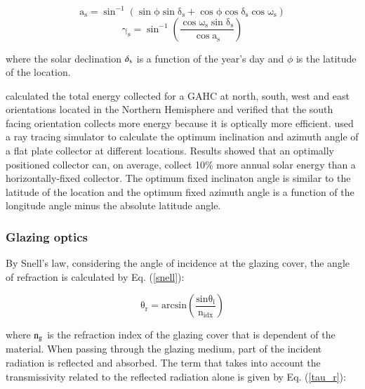 \begin{equation}
	\mathrm{{a_s} = {\sin ^{ - 1}}\left( {\sin \phi \sin {\delta _s} + \cos \phi \cos {\delta _s}\cos {\omega_s}} \right)}
	\label{solar_alt0}
\end{equation}
\vspace*{-0.5cm}
\begin{equation}
	\mathrm{\gamma_s = {\sin^{-1}}\left(\frac{\cos \omega_s \sin \delta_s}{\cos a_s}\right)}
	\label{azimuth0}
\end{equation}

\noindent where the solar declination $\delta_{\rm{s}}$ is a function of the year's day and $\phi$ is the latitude of the location.

\citet{Pottler1999} calculated the total energy collected for a GAHC at north, south, west and east orientations located in the Northern Hemisphere and verified that the south facing orientation collects more energy because it is optically more efficient. \citet{Roux2016} used a ray tracing simulator to calculate the optimum inclination and azimuth angle of a flat plate collector at different locations. Results showed that an optimally positioned collector can, on average, collect 10\% more annual solar energy than a horizontally-fixed collector. The optimum fixed inclinaton angle is similar to the latitude of the location and the optimum fixed azimuth angle is a function of the longitude angle minus the absolute latitude angle.

\subsubsection{Glazing optics}

By Snell's law, considering the angle of incidence at the glazing cover, the angle of refraction is calculated by Eq. (\ref{snell}):

\begin{equation}
	\mathrm{\theta_r = arcsin\left(\frac{sin\theta_i}{n_{idx}} \right)  }
	\label{snell}
\end{equation}

\noindent where $\rm{n_g}$ is the refraction index of the glazing cover that is dependent of the material. When passing through the glazing medium, part of the incident radiation is reflected and absorbed. The term that takes into account the transmissivity related to the reflected radiation alone is given by Eq. (\ref{tau_r}):

%

